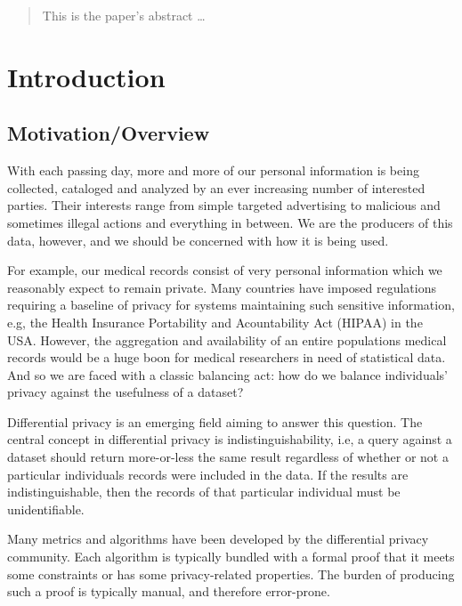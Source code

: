 \documentclass[12pt]{article}
\begin{document}
\maketitle

\lstset{language=Haskell}

\begin{abstract}
This is the paper's abstract \ldots
\end{abstract}

\section{Introduction}\label{sec:introduction}

\subsection{Motivation/Overview}

With each passing day, more and more of our personal information is being collected, cataloged and analyzed by an ever increasing number of interested parties.
Their interests range from simple targeted advertising to malicious and sometimes illegal actions and everything in between.
We are the producers of this data, however, and we should be concerned with how it is being used.

For example, our medical records consist of very personal information which we reasonably expect to remain private.
Many countries have imposed regulations requiring a baseline of privacy for systems maintaining such sensitive information, e.g, the Health Insurance Portability and Acountability Act (HIPAA) in the USA.
However, the aggregation and availability of an entire populations medical records would be a huge boon for medical researchers in need of statistical data.
And so we are faced with a classic balancing act: how do we balance individuals' privacy against the usefulness of a dataset?

Differential privacy is an emerging field aiming to answer this question.
The central concept in differential privacy is indistinguishability, i.e, a query against a dataset should return more-or-less the same result regardless of whether or not a particular individuals records were included in the data.
If the results are indistinguishable, then the records of that particular individual must be unidentifiable.

Many metrics and algorithms have been developed by the differential privacy community.
Each algorithm is typically bundled with a formal proof that it meets some constraints or has some privacy-related properties.
The burden of producing such a proof is typically manual, and therefore error-prone.
\end{document}
